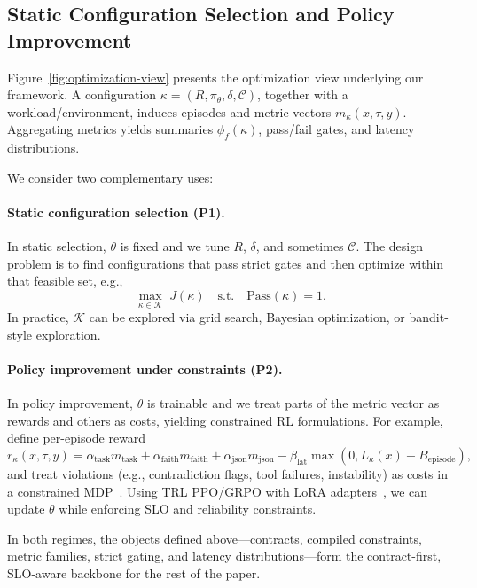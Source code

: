 \documentclass[11pt]{article}
\begin{document}
\subsection{Static Configuration Selection and Policy Improvement}
\label{sec:problem-optimization}

Figure~\ref{fig:optimization-view} presents the optimization view underlying our framework.
A configuration $\kappa=(R,\pi_\theta,\delta,\mathcal{C})$, together with a workload/environment, induces episodes and metric vectors $m_\kappa(x,\tau,y)$.
Aggregating metrics yields summaries $\phi_f(\kappa)$, pass/fail gates, and latency distributions.

We consider two complementary uses:

\paragraph{Static configuration selection (P1).}
In static selection, $\theta$ is fixed and we tune $R$, $\delta$, and sometimes $\mathcal{C}$.
The design problem is to find configurations that pass strict gates and then optimize within that feasible set, e.g.,
\[
\max_{\kappa\in\mathcal{K}} \; J(\kappa)
\quad\text{s.t.}\quad \mathrm{Pass}(\kappa)=1.
\]
In practice, $\mathcal{K}$ can be explored via grid search, Bayesian optimization, or bandit-style exploration.

\paragraph{Policy improvement under constraints (P2).}
In policy improvement, $\theta$ is trainable and we treat parts of the metric vector as rewards and others as costs, yielding constrained RL formulations.
For example, define per-episode reward
\[
r_\kappa(x,\tau,y)=
\alpha_{\text{task}} m_{\text{task}}+
\alpha_{\text{faith}} m_{\text{faith}}+
\alpha_{\text{json}} m_{\text{json}}
-\beta_{\text{lat}}\max(0, L_\kappa(x)-B_{\text{episode}}),
\]
and treat violations (e.g., contradiction flags, tool failures, instability) as costs in a constrained MDP~\citep{altman1999cmdp,achiam2017cpo}.
Using TRL PPO/GRPO with LoRA adapters~\citep{schulman2017ppo,grpo,dettmers2023qlora}, we can update $\theta$ while enforcing SLO and reliability constraints.

In both regimes, the objects defined above---contracts, compiled constraints, metric families, strict gating, and latency distributions---form the contract-first, SLO-aware backbone for the rest of the paper.
\end{document}
